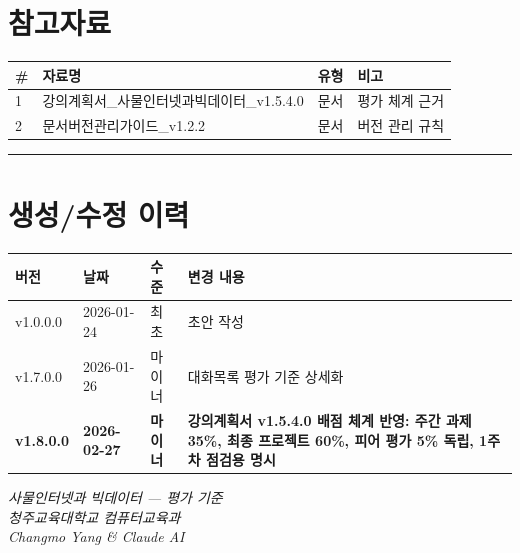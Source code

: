 \documentclass[11pt, a4paper]{article}
\begin{document}
\section*{참고자료}

\begin{table}[h]
\centering
\begin{tabular}{|C{1cm}|L{8cm}|L{2cm}|L{2.5cm}|}
\hline
{}
\textbf{\#} & \textbf{자료명} & \textbf{유형} & \textbf{비고} \\
 & 강의계획서\_사물인터넷과빅데이터\_v1.5.4.0 & 문서 & 평가 체계 근거 \\
 & 문서버전관리가이드\_v1.2.2 & 문서 & 버전 관리 규칙 \\
\hline
\end{tabular}
\end{table}

\vspace{3pt}
\noindent\rule{\textwidth}{0.3pt}

\section*{생성/수정 이력}

\begin{table}[h]
\centering
\small
\begin{tabular}{|L{1.8cm}|L{2cm}|L{1.5cm}|L{8cm}|}
\hline
{}
\textbf{버전} & \textbf{날짜} & \textbf{수준} & \textbf{변경 내용} \\
\hline
v1.0.0.0 & 2026-01-24 & 최초 & 초안 작성 \\
\hline
v1.7.0.0 & 2026-01-26 & 마이너 & 대화목록 평가 기준 상세화 \\
\hline
\textbf{v1.8.0.0} & \textbf{2026-02-27} & \textbf{마이너} & \textbf{강의계획서 v1.5.4.0 배점 체계 반영: 주간 과제 35\%, 최종 프로젝트 60\%, 피어 평가 5\% 독립, 1주차 점검용 명시} \\
\hline
\end{tabular}
\end{table}

\vspace{15pt}
\begin{center}
\textit{사물인터넷과 빅데이터 — 평가 기준}\\[3pt]
\textit{청주교육대학교 컴퓨터교육과}\\[3pt]
\textit{Changmo Yang \& Claude AI}
\end{center}
\end{document}
